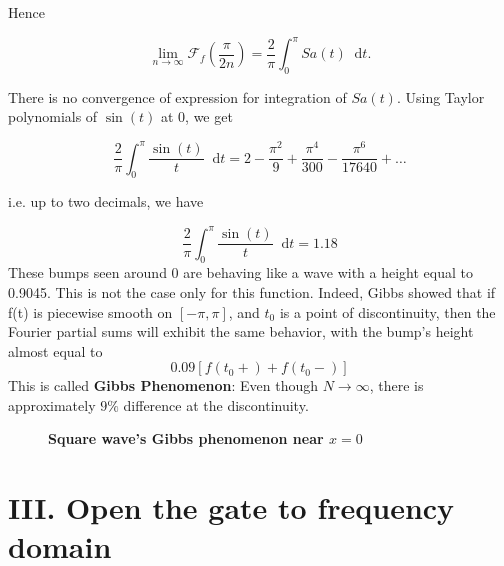 \documentclass[margin,line]{res}
\newcommand*{\dif}{\mathop{}\!\mathrm{d}}
\begin{document}
\begin{resume}
Hence

$$
\lim_{n \rightarrow \infty} \mathscr{F}_f \left(\frac{\pi}{2n}\right) = \frac{2}{\pi}\int_{0}^{\pi}Sa(t) \dif t.
$$

There is no convergence of expression for integration of $Sa(t)$. Using Taylor polynomials of $\sin(t)$ at 0, we get

$$
\frac{2}{\pi}\int_{0}^{\pi}\frac{\sin(t)}{t} \dif t = 2 - \frac{\pi^2}{9} + \frac{\pi^4}{300} - \frac{\pi^6}{17640}+\ldots
$$

i.e. up to two decimals, we have

$$
\frac{2}{\pi}\int_{0}^{\pi}\frac{\sin(t)}{t} \dif t = 1.18
$$
These bumps seen around 0 are behaving like a wave with a height equal to 0.9045. This is not the case only for this function. Indeed, Gibbs showed that if f(t) is piecewise smooth on $[-\pi,\pi]$, and $t_0$ is a point of discontinuity, then the Fourier partial sums will exhibit the same behavior, with the bump's height almost equal to 
$$
0.09\left[ f(t_0+) + f(t_0-)\right]
$$
This is called \textbf{Gibbs Phenomenon}: Even though $N \rightarrow \infty$, there is approximately $9\%$ difference at the discontinuity.
\begin{figure}[H]
	\centerline{\textbf{Square wave's Gibbs phenomenon near $x=0$}}
	\centerline{}
\end{figure}
\clearpage

\section{\sc III. Open the gate to frequency domain}
\hspace{.05in}

\end{resume}
\end{document}
